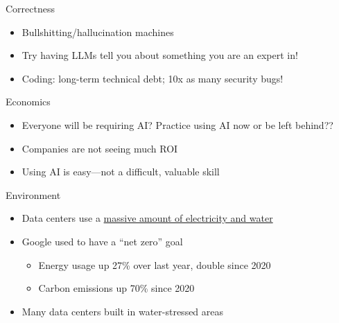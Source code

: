 \documentclass[hyperref={colorlinks},xcolor={usenames,dvipsnames,svgnames,table},12pt]{beamer}
\begin{document}
\begin{frame}{Correctness}
  \begin{itemize}
  \item Bullshitting/hallucination machines
  \item Try having LLMs tell you about something you are an expert in!
  \item Coding: long-term technical debt; 10x as many security bugs!
  \end{itemize}
\end{frame}


\begin{frame}{Economics}
  \begin{itemize}
  \item Everyone will be requiring AI? Practice using AI now or
    be left behind??
  \item Companies are not seeing much ROI
  \item Using AI is easy---not a difficult, valuable skill
  \end{itemize}
\end{frame}

\begin{frame}{Environment}
  \begin{itemize}
  \item Data centers use a \href{https://www.technologyreview.com/2025/05/20/1116327/ai-energy-usage-climate-footprint-big-tech/}{massive amount of electricity and water}
  \item Google used to have a ``net zero'' goal
    \begin{itemize}
    \item Energy usage up 27\% over last year, double since 2020
    \item Carbon emissions up 70\% since 2020
    \end{itemize}
  \item Many data centers built in water-stressed areas
  \end{itemize}
\end{frame}
\end{document}
